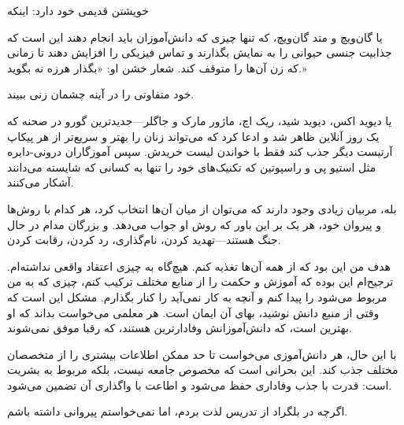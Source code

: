 خویشتن قدیمی خود دارد: اینکه

یا گان‌ویچ و متد گان‌ویچ، که تنها چیزی که دانش‌آموزان باید انجام دهند این است که جذابیت جنسی حیوانی را به نمایش بگذارند و تماس فیزیکی را افزایش دهند تا زمانی که زن آن‌ها را متوقف کند. شعار خشن او: «بگذار هرزه نه بگوید.»

خود متفاوتی را در آینه چشمان زنی ببیند.

یا دیوید اکس، دیوید شید، ریک اچ، ماژور مارک و جاگلر—جدیدترین گورو در صحنه که یک روز آنلاین ظاهر شد و ادعا کرد که می‌تواند زنان را بهتر و سریع‌تر از هر پیکاپ آرتیست دیگر جذب کند فقط با خواندن لیست خریدش. سپس آموزگاران درونی-دایره مثل استیو پی و راسپوتین که تکنیک‌های خود را تنها به کسانی که شایسته می‌دانند آشکار می‌کنند.

بله، مربیان زیادی وجود دارند که می‌توان از میان آن‌ها انتخاب کرد، هر کدام با روش‌ها و پیروان خود، هر یک بر این باور که روش او جواب می‌دهد. و بزرگان مدام در حال جنگ هستند—تهدید کردن، نام‌گذاری، رد کردن، رقابت کردن.

هدف من این بود که از همه آن‌ها تغذیه کنم. هیچ‌گاه به چیزی اعتقاد واقعی نداشته‌ام. ترجیح‌ام این بوده که آموزش و حکمت را از منابع مختلف ترکیب کنم، چیزی که به من مربوط می‌شود را پیدا کنم و آنچه به کار نمی‌آید را کنار بگذارم. مشکل این است که وقتی از منبع دانش نوشید، بهای آن ایمان است. هر معلمی می‌خواست بداند که او بهترین است، که دانش‌آموزانش وفادارترین هستند، که رقبا موفق نمی‌شوند.

با این حال، هر دانش‌آموزی می‌خواست تا حد ممکن اطلاعات بیشتری را از متخصصان مختلف جذب کند. این بحرانی است که مخصوص جامعه نیست، بلکه مربوط به بشریت است: قدرت با جذب وفاداری حفظ می‌شود و اطاعت با واگذاری آن تضمین می‌شود.

اگرچه در بلگراد از تدریس لذت بردم، اما نمی‌خواستم پیروانی داشته باشم.